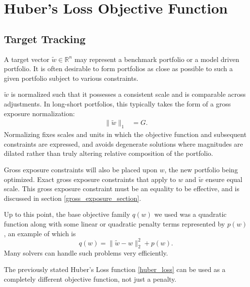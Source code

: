 \documentclass[11pt, letterpaper]{article}
\begin{document}
\section{Huber's Loss Objective Function}
\subsection{Target Tracking}
\label{target_objective_section}

A target vector $\tilde{w} \in \mathds{R}^n$ may represent a benchmark portfolio or a model driven portfolio. It is often
desirable to form portfolios as close as possible to such a given portfolio subject to various constraints.

$\tilde{w}$ is normalized such that it possesses a consistent scale and is comparable across adjustments.  In
long-short portfolios, this typically takes the form of a gross exposure normalization:
\begin{align*}
    \lVert\tilde{w}\rVert_1 & = G.
\end{align*}
Normalizing fixes scales and units in which the objective function and subsequent constraints are
expressed, and avoids degenerate solutions where magnitudes are dilated rather than truly
altering relative composition of the portfolio.

Gross exposure constraints will also be placed upon $w$, the new portfolio being optimized. Exact gross exposure
constraints that apply to $w$ and $\tilde{w}$ ensure equal scale.
This gross exposure constraint must be an equality to be effective, and is discussed in
section \ref{gross_exposure_section}.

Up to this point, the base objective family $q(w)$ we used was a quadratic function along with some linear or quadratic penalty
terms represented by $p(w)$, an example of which is
\begin{equation*}
	q(w) = \lVert\tilde{w} - w\rVert_2^2 + p(w).
\end{equation*}
Many solvers can handle such problems very efficiently.

The previously stated Huber's Loss function \eqref{huber_loss} can be used as a completely different objective function, not just a penalty.
\end{document}
